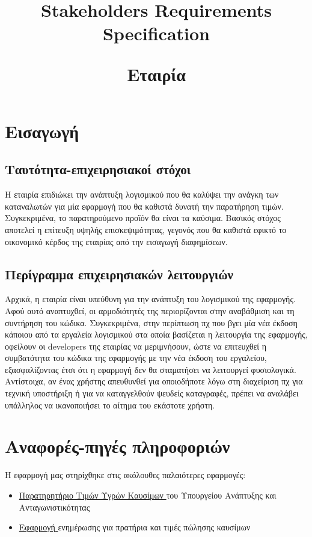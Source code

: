 \documentclass[a4paper,oneside, 12pt]{article}
\title{Stakeholders Requirements Specification\\
\begin{flushleft}
	Εταιρία
\end{flushleft}}
\date{\vspace{-5ex}}
\begin{document}
\maketitle
\section{Εισαγωγή}
\subsection{Ταυτότητα-επιχειρησιακοί στόχοι}

Η εταιρία επιδιώκει την ανάπτυξη λογισμικού που θα καλύψει την ανάγκη των
καταναλωτών για μία εφαρμογή που θα καθιστά δυνατή την παρατήρηση τιμών.
Συγκεκριμένα, το παρατηρούμενο προϊόν θα είναι τα καύσιμα. Βασικός στόχος
αποτελεί η επίτευξη υψηλής επισκεψιμότητας, γεγονός που θα καθιστά εφικτό
το οικονομικό κέρδος της εταιρίας από την εισαγωγή διαφημίσεων.

\subsection{Περίγραμμα επιχειρησιακών λειτουργιών}

Αρχικά, η εταιρία είναι υπεύθυνη για την ανάπτυξη του λογισμικού της
εφαρμογής. Αφού αυτό αναπτυχθεί, οι αρμοδιότητές της περιορίζονται στην
αναβάθμιση και τη συντήρηση του κώδικα. Συγκεκριμένα, στην περίπτωση πχ
που βγει μία νέα έκδοση κάποιου από τα εργαλεία λογισμικού στα οποία
βασίζεται η λειτουργία της εφαρμογής, οφείλουν οι developers της εταιρίας να
μεριμνήσουν, ώστε να επιτευχθεί η συμβατότητα του κώδικα της εφαρμογής με
την νέα έκδοση του εργαλείου, εξασφαλίζοντας έτσι ότι η εφαρμογή δεν θα
σταματήσει να λειτουργεί φυσιολογικά. Αντίστοιχα, αν ένας χρήστης απευθυνθεί
για οποιοδήποτε λόγω στη διαχείριση πχ για τεχνική υποστήριξη ή για να
καταγγελθούν ψευδείς καταγραφές, πρέπει να αναλάβει υπάλληλος να
ικανοποιήσει το αίτημα του εκάστοτε χρήστη.

\section{Αναφορές-πηγές πληροφοριών}

Η εφαρμογή μας στηρίχθηκε στις ακόλουθες παλαιότερες εφαρμογές:

\begin{itemize}
	
	\item \href{http://www.fuelprices.gr/}{Παρατηρητήριο Τιμών Υγρών Καυσίμων }
	του Υπουργείου Ανάπτυξης και Ανταγωνιστικότητας
	
	\item \href{https://fuelgr.gr}{Εφαρμογή }
	ενημέρωσης για πρατήρια και τιμές πώλησης καυσίμων
	
	
\end{itemize}
\end{document}
